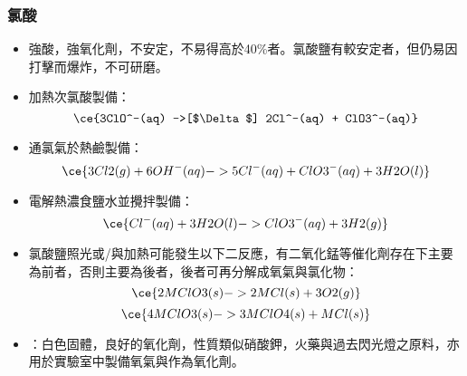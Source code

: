 \documentclass[a4paper,12pt]{report}
\begin{document}
\subsubsection{氯酸}
\begin{itemize}
\item 強酸，強氧化劑，不安定，不易得高於40\%者。氯酸鹽有較安定者，但仍易因打擊而爆炸，不可研磨。
\item 加熱次氯酸製備：
\[\ce{3ClO^-(aq) ->[$\Delta$] 2Cl^-(aq) + ClO3^-(aq)}\]
\item 通氯氣於熱鹼製備：
\[\ce{3Cl2(g) + 6OH^-(aq) -> 5Cl^-(aq) + ClO3^-(aq) + 3H2O(l)}\]
\item 電解熱濃食鹽水並攪拌製備：
\[\ce{Cl^-(aq) + 3H2O(l) -> ClO3^-(aq) + 3H2(g)}\]
\item 氯酸鹽照光或/與加熱可能發生以下二反應，有二氧化錳等催化劑存在下主要為前者，否則主要為後者，後者可再分解成氧氣與氯化物：
\[\ce{2MClO3(s) -> 2MCl(s) + 3O2(g)}\]
\[\ce{4MClO3(s) -> 3MClO4(s) + MCl(s)}\]
\item {}：白色固體，良好的氧化劑，性質類似硝酸鉀，火藥與過去閃光燈之原料，亦用於實驗室中製備氧氣與作為氧化劑。
\end{itemize}
\end{document}
